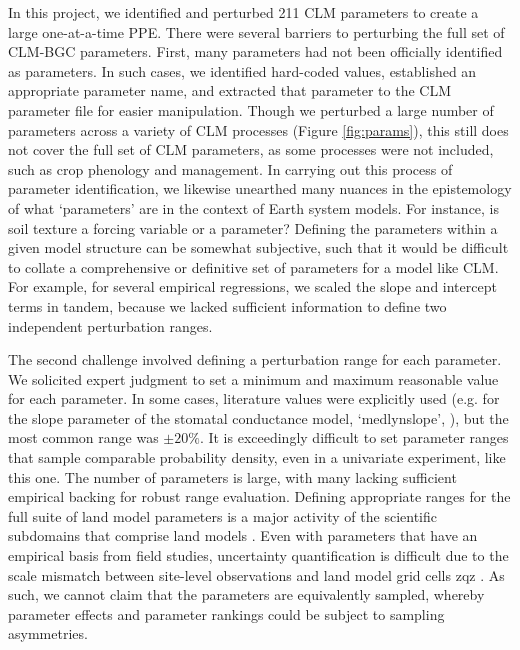 \documentclass[draft]{agujournal2019}
\begin{document}
In this project, we identified and perturbed 211 CLM parameters to create a large one-at-a-time PPE. There were several barriers to perturbing the full set of CLM-BGC parameters. First, many parameters had not been officially identified as parameters. In such cases, we identified hard-coded values, established an appropriate parameter name, and extracted that parameter to the CLM parameter file for easier manipulation. Though we perturbed a large number of parameters across a variety of CLM processes (Figure \ref{fig:params}), this still does not cover the full set of CLM parameters, as some processes were not included, such as crop phenology and management. In carrying out this process of parameter identification, we likewise unearthed many nuances in the epistemology of what `parameters' are in the context of Earth system models. For instance, is soil texture a forcing variable or a parameter? Defining the parameters within a given model structure can be somewhat subjective, such that it would be difficult to collate a comprehensive or definitive set of parameters for a model like CLM. For example, for several empirical regressions, we scaled the slope and intercept terms in tandem, because we lacked sufficient information to define two independent perturbation ranges.

The second challenge involved defining a perturbation range for each parameter. We solicited expert judgment to set a minimum and maximum reasonable value for each parameter. In some cases, literature values were explicitly used (e.g. for the slope parameter of the stomatal conductance model, `medlynslope', ), but the most common range was $\pm20\%$. It is exceedingly difficult to set parameter ranges that sample comparable probability density, even in a univariate experiment, like this one. The number of parameters is large, with many lacking sufficient empirical backing for robust range evaluation. Defining appropriate ranges for the full suite of land model parameters is a major activity of the scientific subdomains that comprise land models \cite{kattge2020}. Even with parameters that have an empirical basis from field studies, uncertainty quantification is difficult due to the scale mismatch between site-level observations and land model grid cells zqz \cite{liu2021}. As such, we cannot claim that the parameters are equivalently sampled, whereby parameter effects and parameter rankings could be subject to sampling asymmetries.
\end{document}
